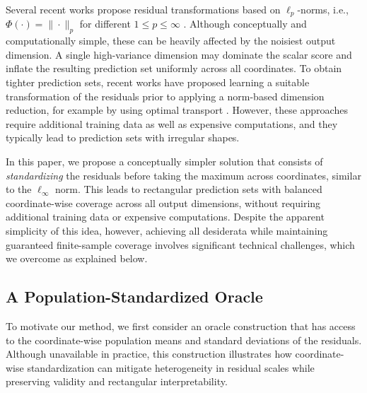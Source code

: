 {\color{brown}Several recent works propose residual transformations based on $\ell_p$-norms, i.e., $\Phi(\cdot) = \|\cdot\|_p$ for different $1\leq p \leq \infty$ \citep{johnstone2022exact}. Although conceptually and computationally simple, these can be heavily affected by the noisiest output dimension. A single high-variance dimension may dominate the scalar score and inflate the resulting prediction set uniformly across all coordinates. 
To obtain tighter prediction sets, recent works have proposed learning a suitable transformation of the residuals prior to applying a norm-based dimension reduction, for example by using optimal transport \citep{thurin2025otcp, klein2025multivariate}.
However, these approaches require additional training data as well as expensive computations, and they typically lead to prediction sets with irregular shapes.}

In this paper, we propose a conceptually simpler solution that consists of {\em standardizing} the residuals before taking the maximum across coordinates, similar to the $\ell_\infty$ norm. This leads to rectangular prediction sets with balanced coordinate-wise coverage across all output dimensions, without requiring additional training data or expensive computations.
Despite the apparent simplicity of this idea, however, achieving all desiderata while maintaining guaranteed finite-sample coverage involves significant technical challenges, which we overcome as explained below.


\subsection{A Population-Standardized Oracle}
\label{sec:pop-oracle}
 
To motivate our method, we first consider an oracle construction that has access to the coordinate-wise population means and standard deviations of the residuals. 
Although unavailable in practice, this
construction illustrates how coordinate-wise standardization can mitigate heterogeneity in residual scales while preserving validity and rectangular interpretability.

